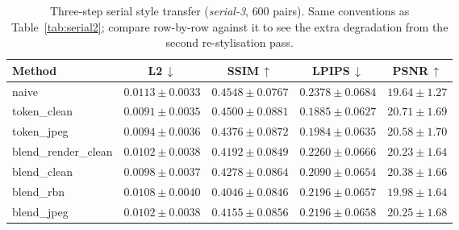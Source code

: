 \documentclass[conference]{IEEEtran}
\begin{document}
\begin{table}[t]
\centering
\caption{Three-step serial style transfer (\emph{serial-3}, $600$ pairs). Same conventions as Table~\ref{tab:serial2}; compare row-by-row against it to see the extra degradation from the second re-stylisation pass.}
\label{tab:serial3}
\setlength{\tabcolsep}{16pt}
\small
\begin{tabular}{lcccc}
\toprule
\textbf{Method} & \textbf{L2}\,$\downarrow$ & \textbf{SSIM}\,$\uparrow$ & \textbf{LPIPS}\,$\downarrow$ & \textbf{PSNR}\,$\uparrow$ \\
\midrule
naive                & $0.0113\pm0.0033$ & $0.4548\pm0.0767$ & $0.2378\pm0.0684$ & $19.64\pm1.27$ \\
\rowcolor{rowshade}
token\_clean          & $\mathbf{0.0091\pm0.0035}$ & $0.4500\pm0.0881$ & $\mathbf{0.1885\pm0.0627}$ & $\mathbf{20.71\pm1.69}$ \\
token\_jpeg           & $0.0094\pm0.0036$ & $0.4376\pm0.0872$ & $0.1984\pm0.0635$ & $20.58\pm1.70$ \\
\rowcolor{rowshade}
blend\_render\_clean  & $0.0102\pm0.0038$ & $0.4192\pm0.0849$ & $0.2260\pm0.0666$ & $20.23\pm1.64$ \\
blend\_clean          & $0.0098\pm0.0037$ & $0.4278\pm0.0864$ & $0.2090\pm0.0654$ & $20.38\pm1.66$ \\
\rowcolor{rowshade}
blend\_rbn            & $0.0108\pm0.0040$ & $0.4046\pm0.0846$ & $0.2196\pm0.0657$ & $19.98\pm1.64$ \\
blend\_jpeg           & $0.0102\pm0.0038$ & $0.4155\pm0.0856$ & $0.2196\pm0.0658$ & $20.25\pm1.68$ \\
\bottomrule
\end{tabular}
\end{table}
\end{document}
